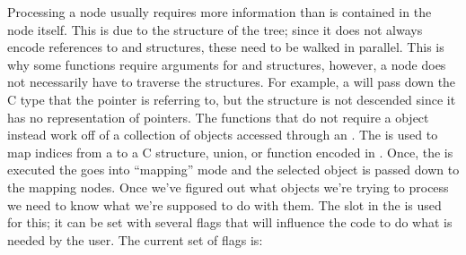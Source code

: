 Processing a \PRESC{} node usually requires more information than is contained
in the node itself.  This is due to the structure of the \PRESC{} tree; since
it does not always encode references to \CAST{} and \MINT{} structures, these
need to be walked in parallel.  This is why some functions require arguments
for \CAST{} and \MINT{} structures, however, a \PRESC{} node does not
necessarily have to traverse the structures.  For example, a
 will pass down the C type that the pointer
is referring to, but the \MINT{} structure is not descended since it has no
representation of pointers.  The functions that do not require a \CAST{} object
instead work off of a collection of \CAST{} objects accessed through an
.  The  is used to map indices from a
 to a C structure, union, or function encoded
in \CAST{}.  Once, the  is executed the
 goes into ``mapping'' mode and the selected \CAST{} object is
passed down to the mapping nodes.  Once we've figured out what objects we're
trying to process we need to know what we're supposed to do with them.  The
 slot in the  is used for this; it can be set
with several flags that will influence the code to do what is needed by the
user.  The current set of flags is:

